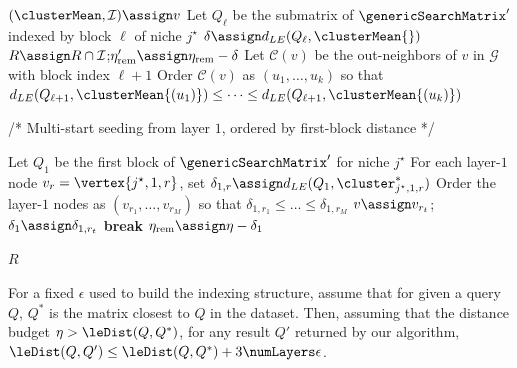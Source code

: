 \documentclass[pdflatex,sn-mathphys-num]{sn-jnl}%
\theoremstyle{thmstyleone}%
\theoremstyle{thmstyletwo}%
\theoremstyle{thmstylethree}%
\begin{document}
\begin{appendices}
\begin{algorithm}[h]
\begin{algorithmic}[1]
  \State $(\clusterMean,\mathcal{I}) \assign v$
  \State Let $Q_\ell$ be the submatrix of $\genericSearchMatrix'$ indexed by block $\ell$ of niche $j^\star$
  \State $\delta \assign d_{LE}(Q_\ell,\clusterMean{})$
    \State \Return {}
  \EndIf
  \State $R \assign R \cap \mathcal{I}$;\quad $\eta'_{\mathrm{rem}} \assign \eta_{\mathrm{rem}} - \delta$
    \State \Return {}
  \EndIf
  \State Let $\mathcal{C}(v)$ be the out-neighbors of $v$ in $\mathcal{G}$ with block index $\ell+1$
  \State Order $\mathcal{C}(v)$ as $(u_1,\dots,u_k)$ so that
  \Statex \hspace{2.0em}
    $d_{LE}(Q_{\ell+1},\clusterMean{(u_1)}) \le \dots \le d_{LE}(Q_{\ell+1},\clusterMean{(u_k)})$
    \State {}
  \EndFor
\EndProcedure

\Statex /* Multi-start seeding from layer $1$, ordered by first-block distance */

\State Let $Q_1$ be the first block of $\genericSearchMatrix'$ for niche $j^\star$
\State For each layer-$1$ node $v_r=\vertex{j^\star,1,r}$, set
\Statex \hspace{2.0em} $\delta_{1,r} \assign d_{LE}(Q_1,\cluster^{\ast}_{j^\star,1,r})$
\State Order the layer-$1$ nodes as $(v_{r_1},\dots,v_{r_M})$ so that
\Statex \hspace{2.0em} $\delta_{1,r_1}\le \dots \le \delta_{1,r_M}$
  \State $v \assign v_{r_t}$;\quad $\delta_1 \assign \delta_{1,r_t}$
    \State \textbf{break} 
  \EndIf
  \State $\eta_{\mathrm{rem}} \assign \eta - \delta_1$
  \State {}
\EndFor

\State \Return $R$

\end{algorithmic}
\end{algorithm}


\newcommand{\queryMat}{\ensuremath{Q}\xspace}
\newcommand{\optMat}{\ensuremath{Q^{*}}\xspace}
\newcommand{\queryRetMat}{\ensuremath{Q'}\xspace}


\begin{theorem}\label{thm:search_cost_bound}
For a fixed $\epsilon$ used to build the \OurMethod indexing structure, assume that for given a query $\queryMat$, $\optMat$ is the matrix closest to $\queryMat$ in the dataset. Then, assuming that the distance budget $\eta > \leDist(\queryMat, \optMat)$, for any result $\queryRetMat$ returned by our algorithm, 
$\leDist(\queryMat, \queryRetMat)  \le \leDist(\queryMat, \optMat) + 3 \numLayers \epsilon$.









\end{theorem}
\end{appendices}
\end{document}
